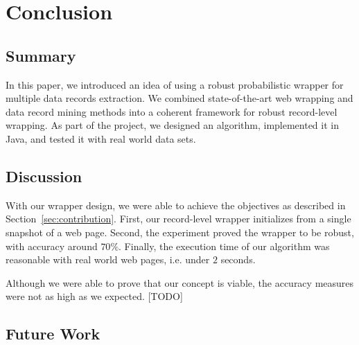 \chapter{Conclusion}
\label{ch:conclusion}


\section{Summary}

In this paper, we introduced an idea of using a robust probabilistic wrapper for multiple data records extraction. We combined state-of-the-art web wrapping and data record mining methods into a coherent framework for robust record-level wrapping. As part of the project, we designed an algorithm, implemented it in Java, and tested it with real world data sets.


\section{Discussion}

With our wrapper design, we were able to achieve the objectives as described in Section~\ref{sec:contribution}. First, our record-level wrapper initializes from a single snapshot of a web page. Second, the experiment proved the wrapper to be robust, with accuracy around $70\%$. Finally, the execution time of our algorithm was reasonable with real world web pages, i.e. under $2$ seconds.


Although we were able to prove that our concept is viable, the accuracy measures were not as high as we expected. [TODO]


\section{Future Work}
\label{sec:future-work}

